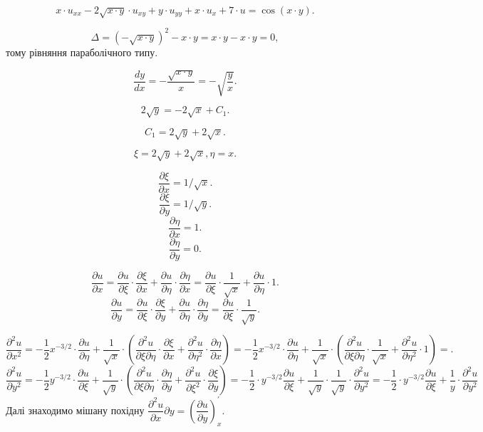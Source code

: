 \[ x \cdot u_{x x} - 2 \sqrt{x \cdot y} \cdot u_{x y} + y \cdot u_{y y} + x \cdot u_x + 7 \cdot u = \cos (x \cdot y). \]

\[ \Delta = ( - \sqrt{x \cdot y})^2 - x \cdot y = x \cdot y - x \cdot y = 0, \]
тому рівняння параболічного типу.

\[ \dfrac{d y}{d x} = - \dfrac{\sqrt{x \cdot y}}{x} = - \sqrt{\dfrac{y}{x}}. \]

\[ 2 \sqrt{y} = - 2 \sqrt{x} + C_1. \]

\[ C_1 = 2 \sqrt{y} + 2 \sqrt{x}. \]

\[ \xi = 2 \sqrt{y} + 2 \sqrt{x}, \eta = x. \]

\[ \dfrac{\partial \xi}{\partial x} = 1 / \sqrt{x}. \]
\[ \dfrac{\partial \xi}{\partial y} = 1 / \sqrt{y}. \]
\[ \dfrac{\partial \eta}{\partial x} = 1. \]
\[ \dfrac{\partial \eta}{\partial y} = 0. \]

\[ \dfrac{\partial u}{\partial x} = \dfrac{\partial u}{\partial \xi} \cdot \dfrac{\partial \xi}{\partial x} + \dfrac{\partial u}{\partial \eta} \cdot \dfrac{\partial \eta}{\partial x} = \dfrac{\partial u}{\partial \xi} \cdot \dfrac{1}{\sqrt{x}} + \dfrac{\partial u}{\partial \eta} \cdot 1. \]
\[ \dfrac{\partial u}{\partial y} = \dfrac{\partial u}{\partial \xi} \cdot \dfrac{\partial \xi}{\partial y} + \dfrac{\partial u}{\partial \eta} \cdot \dfrac{\partial \eta}{\partial y} = \dfrac{\partial u}{\partial \xi} \cdot \dfrac{1}{\sqrt{y}}. \]

\[ \dfrac{\partial^2 u}{\partial x^2} = - \dfrac 1 2 x^{-3/2} \cdot \dfrac{\partial u}{\partial \eta} + \dfrac 1 {\sqrt{x}} \cdot \left( \dfrac{\partial^2 u}{\partial \xi \partial \eta} \cdot \dfrac{\partial \xi}{\partial x} + \dfrac{\partial^2 u}{\partial \eta^2} \cdot \dfrac{\partial \eta}{\partial x} \right) = - \dfrac 1 2 x^{-3/2} \cdot \dfrac{\partial u}{\partial \eta} + \dfrac 1 {\sqrt{x}} \cdot \left( \dfrac{\partial^2 u}{\partial \xi \partial \eta} \cdot \dfrac{1}{\sqrt{x}} + \dfrac{\partial^2 u}{\partial \eta^2} \cdot 1 \right) = . \]
\[ \dfrac{\partial^2 u}{\partial y^2} = - \dfrac 1 2 y^{-3/2} \cdot \dfrac{\partial u}{\partial \xi} + \dfrac 1 {\sqrt{y}} \cdot \left( \dfrac{\partial^2 u}{\partial \xi \partial \eta} \cdot \dfrac{\partial \eta}{\partial y} + \dfrac{\partial^2 u}{\partial \xi^2} \cdot \dfrac{\partial \xi}{\partial y} \right) = - \dfrac 1 2 \cdot y^{-3/2}  \dfrac{\partial u}{\partial \xi}  + \dfrac 1 {\sqrt{y}} \cdot \dfrac 1 {\sqrt{y}} \cdot \dfrac{\partial^2 u}{\partial y^2} = - \dfrac 1 2 \cdot y^{-3/2}  \dfrac{\partial u}{\partial \xi}  + \dfrac 1 y \cdot \dfrac{\partial^2 u}{\partial y^2} \]
Далі знаходимо мішану похідну $\dfrac{\partial^2 u}{\partial x}{\partial y} = \left( \dfrac{\partial u}{\partial y} \right)_x^\prime$.\\

